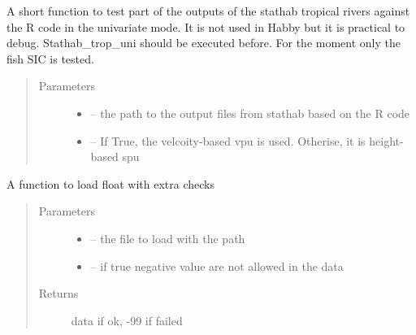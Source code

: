\documentclass[letterpaper,10pt,english]{sphinxmanual}
\begin{document}
\begin{fulllineitems}
\begin{fulllineitems}
\label{\detokenize{index:src.stathab_c.Stathab.test_stathab_trop_uni}}
A short function to test part of the outputs of the stathab tropical rivers against the R code
in the univariate mode. It is not used in Habby but it is practical to debug. Stathab\_trop\_uni should be
executed before. For the moment only the fish SIC is tested.
\begin{quote}\begin{description}
\item[{Parameters}] \leavevmode\begin{itemize}
\item {} 
 -- the path to the output files from stathab based on the R code

\item {} 
 -- If True, the velcoity-based vpu is used. Otherise, it is height-based spu

\end{itemize}

\end{description}\end{quote}

\end{fulllineitems}


\end{fulllineitems}


\begin{fulllineitems}
\label{\detokenize{index:src.stathab_c.load_float_stathab}}
A function to load float with extra checks
\begin{quote}\begin{description}
\item[{Parameters}] \leavevmode\begin{itemize}
\item {} 
 -- the file to load with the path

\item {} 
 -- if true negative value are not allowed in the data

\end{itemize}

\item[{Returns}] \leavevmode
data if ok, -99 if failed

\end{description}\end{quote}

\end{fulllineitems}
\end{document}
